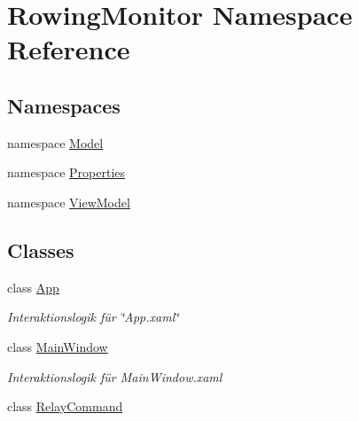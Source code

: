 \hypertarget{namespace_rowing_monitor}{}\section{Rowing\+Monitor Namespace Reference}
\label{namespace_rowing_monitor}
\subsection*{Namespaces}
\begin{DoxyCompactItemize}
\item 
namespace \hyperlink{namespace_rowing_monitor_1_1_model}{Model}
\item 
namespace \hyperlink{namespace_rowing_monitor_1_1_properties}{Properties}
\item 
namespace \hyperlink{namespace_rowing_monitor_1_1_view_model}{View\+Model}
\end{DoxyCompactItemize}
\subsection*{Classes}
\begin{DoxyCompactItemize}
\item 
class \hyperlink{class_rowing_monitor_1_1_app}{App}
\begin{DoxyCompactList}\small\item\em Interaktionslogik für \char`\"{}\+App.\+xaml\char`\"{} \end{DoxyCompactList}\item 
class \hyperlink{class_rowing_monitor_1_1_main_window}{Main\+Window}
\begin{DoxyCompactList}\small\item\em Interaktionslogik für Main\+Window.\+xaml \end{DoxyCompactList}\item 
class \hyperlink{class_rowing_monitor_1_1_relay_command}{Relay\+Command}
\end{DoxyCompactItemize}
